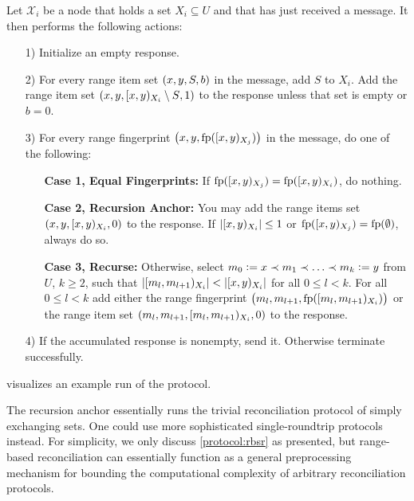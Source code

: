 \documentclass[conference]{IEEEtran}
\newcommand{\peer}[1]{\ensuremath{\mathcal{X}_{#1}}}
\begin{document}
\begin{protocol}
\label{protocol:rbsr}

Let \peer{i} be a node that holds a set $X_i \subseteq U$ and that has just received a message. It then performs the following actions:

\begin{enumerate}
    \item[1)] Initialize an empty response.
    \item[2)] For every range item set $({x}, {y}, {S}, {b})$ in the message, add $S$ to $X_i$. Add the range item set $({x}, {y}, {[{x},{y})_{X_i} \setminus S}, {1})$ to the response unless that set is empty or $b = 0$.
    \item[3)] For every range fingerprint $\bigl({x}, {y}, {\operatorname{fp}([{x},{y})_{X_j})}\bigr)$ in the message, do one of the following:
        \begin{enumerate}
            \item[] \textbf{Case 1, Equal Fingerprints:}\newline
			If $\operatorname{fp}([{x},{y})_{X_j}) = \operatorname{fp}([{x},{y})_{X_i})$, do nothing.
            \item[] \textbf{Case 2, Recursion Anchor:} You may add the range items set $({x}, {y}, [{x},{y})_{X_i}, {0})$ to the response. If $|{[{x},{y})_{X_i}}| \leq 1$ or $\operatorname{fp}([{x},{y})_{X_j}) = \operatorname{fp}(\emptyset)$, always do so.
            \item[] \textbf{Case 3, Recurse:} Otherwise, select $m_0 \vcentcolon= x \prec m_1 \prec \ldots \prec m_k \vcentcolon= y$ from $U$, $k \geq 2$, such that $|{[{m_l},{m_{l + 1}})_{X_i}}| < |{[{x},{y})_{X_i}}|$ for all $0 \leq l < k$. For all $0 \leq l < k$ add either the range fingerprint $\bigl({m_l}, {m_{l + 1}}, {\operatorname{fp}([{m_l},{m_{l + 1}})_{X_i})}\bigr)$ or the range item set $({m_l}, {m_{l + 1}}, [{m_l},{m_{l + 1}})_{X_i}, {0})$ to the response.
        \end{enumerate}
    \item[4)] If the accumulated response is nonempty, send it. Otherwise terminate successfully.
\end{enumerate}
\end{protocol}

 visualizes an example run of the protocol.

The recursion anchor essentially runs the trivial reconciliation protocol of simply exchanging sets. One could use more sophisticated single-roundtrip protocols instead. For simplicity, we only discuss \cref{protocol:rbsr} as presented, but range-based reconciliation can essentially function as a general preprocessing mechanism for bounding the computational complexity of arbitrary reconciliation protocols.
\end{document}
